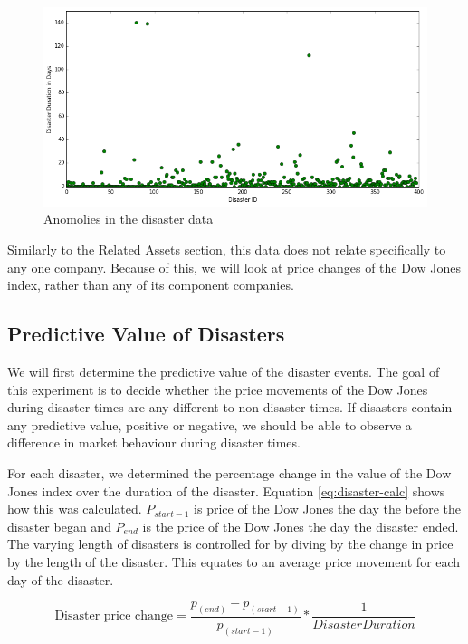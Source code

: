 \documentclass{report}
\begin{document}
\begin{figure}[H]
	\caption{Anomolies in the disaster data}
	\centerline{\includegraphics[width=\textwidth]{vis/disaster_data.png}}
	\label{fig:disaster-data}
\end{figure}

Similarly to the Related Assets section, this data does not relate specifically to any one company. Because of this, we will look at price changes of the Dow Jones index, rather than any of its component companies. 

\subsection{Predictive Value of Disasters}

We will first determine the predictive value of the disaster events. The goal of this experiment is to decide whether the price movements of the Dow Jones during disaster times are any different to non-disaster times. If disasters contain any predictive value, positive or negative, we should be able to observe a difference in market behaviour during disaster times.

For each disaster, we determined the percentage change in the value of the Dow Jones index over the duration of the disaster. Equation \ref{eq:disaster-calc} shows how this was calculated. $P_{start - 1}$ is price of the Dow Jones the day the before the disaster began and $P_{end}$ is the price of the Dow Jones the day the disaster ended. The varying length of disasters is controlled for by diving by the change in price by the length of the disaster. This equates to an average price movement for each day of the disaster. 

\begin{figure}[H]
\begin{center}
    \begin{equation}
      \text{Disaster price change} = \dfrac{p_{(end)} - p_{(start - 1)}} {p_{(start - 1)}} * \dfrac{1}{Disaster Duration}
      \label{eq:disaster-calc}
    \end{equation}
\end{center}
\end{figure}
\end{document}
